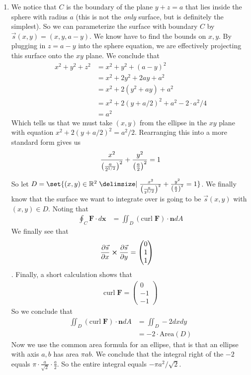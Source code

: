 \documentclass[12pt]{article}
\theoremstyle{definition}
\theoremstyle{remark}
\newcommand{\R}{\mathbb{R}}
\begin{document}
\begin{enumerate}[leftmargin=\labelsep]
		\item 
		We notice that $C$ is the boundary of the plane $y+z=a$ that lies inside the sphere with radius $a$ (this is not the \textit{only} surface, but is definitely the simplest). So we can parameterize the surface with boundary $C$ by $\vec{s}(x, y) = (x, y, a-y)$. We know have to find the bounds on $x, y$. By plugging in $z = a-y$ into the sphere equation, we are effectively projecting this surface onto the $xy$ plane. We conclude that
		\begin{align*}
			x^2+y^2+z^2 &= x^2+y^2+(a-y)^2 \\
			&= x^2+2y^2+2ay+a^2 \\
			&= x^2+2(y^2+ay)+a^2 \\
			&= x^2+2(y+a/2)^2+a^2- 2 \cdot a^2/4 \\
			&= a^2
		\end{align*}
		Which tells us that we must take $(x, y)$ from the ellipse in the $xy$ plane with equation $x^2+2(y+a/2)^2=a^2/2$. Rearranging this into a more standard form gives us 
		\begin{align*}
			\frac{x^2}{\qty(\frac {a}{2^{1/2}})^2} + \frac{y^2}{\qty(\frac a2)^2} = 1
		\end{align*}
				
		So let $D = \set{(x,y) \in \R^2 \given \frac{x^2}{\qty(\frac {a}{2^{1/2}})^2} + \frac{y^2}{\qty(\frac a2)^2} = 1}$. We finally know that the surface we want to integrate over is going to be $\vec{s}(x, y)$ with $(x, y) \in D$. Noting that
		\begin{align*}
			\oint_C \textbf{F} \cdot d\textbf{x} &= \iint_D (\mathrm{curl \;}\textbf{F}) \cdot \textbf{n} dA
		\end{align*}
		We finally see that
		\begin{align*}
			\pdv{\vec{s}}{x} \cross \pdv{\vec{s}}{y} &= \begin{pmatrix}
				0 \\ 1 \\ 1
			\end{pmatrix}
		\end{align*}. Finally, a short calculation shows that
		\begin{align*}
			\mathrm{curl \;}\textbf{F} = \begin{pmatrix}
				0 \\ -1 \\ -1
			\end{pmatrix}
		\end{align*}
		So we conclude that
		\begin{align*}
			\iint_D (\mathrm{curl \;}\textbf{F}) \cdot \textbf{n} dA &= \iint_D -2 dxdy \\
			&= -2 \cdot \mathrm{Area}(D)
		\end{align*}
		Now we use the common area formula for an ellipse, that is that an ellipse with axis $a, b$ has area $\pi a b$. We conclude that the integral right of the $-2$ equals $\pi \cdot \frac{a}{\sqrt{2}} \cdot \frac{a}{2}$. So the entire integral equals $-\pi a^2/\sqrt{2}$.
		

\end{enumerate}
\end{document}
